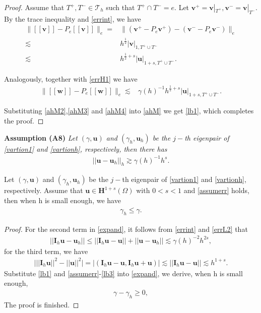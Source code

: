 \documentclass[leqno,CJK]{siamltex704}
\numberwithin{equation}{section}
\def\T{{\mathcal{T}}}
\def\bw{{\mathbf{w}}}
\def\bu{{\mathbf{u}}}
\def\bv{{\mathbf{v}}}
\def\bh{{\mathbf{H}}}
\def\bi{{\mathbf{I}}}
\begin{document}
\begin{proof}
	Assume that $T^+,T^-\in\T_h$ such that $T^+\cap T^-=e$. Let $\bv^+=\bv|_{T^+},\bv^-=\bv|_{T^-}$. By the trace inequality and \eqref{errint}, we have
	\begin{align}\label{ahM3}
		\big\|[\![\bv]\!]-P_e[\![\bv]\!]\big\|_e=&
		\big\|(\bv^+-P_e\bv^+)-(\bv^--P_e\bv^-)\big\|_e\nonumber
		\\
		\lesssim&h^{\frac{1}{2}}|\bv|_{1,T^+\cup T^-}
		\\
		\lesssim& h^{\frac{1}{2}+s}|\bu|_{1+s,T^+\cup T^-}.\nonumber
	\end{align}
	
	Analogously, together with \eqref{errH1} we have
	\begin{align}\label{ahM4}
		\big\|[\![\bw]\!]-P_e[\![\bw]\!]\big\|_e
		\lesssim& \gamma(h)^{-1}h^{\frac{1}{2}+s}|\bu|_{1+s,T^+\cup T^-}.
	\end{align}
	
	Substituting \eqref{ahM2},\eqref{ahM3} and \eqref{ahM4} into \eqref{ahM} we get \eqref{lb1}, which completes the proof.
\end{proof}
	
\textbf{Assumption (A8)}\emph{ Let $(\gamma,\bu)$ and $(\gamma_h,\bu_h)$ be the $j-$th eigenpair of \eqref{vartion1} and \eqref{vartionh}, respectively, then there has
	\begin{eqnarray}\label{assumerr}
		||\bu-\bu_h||_h\gtrsim \gamma(h)^{-1}h^s.
\end{eqnarray}}
\begin{lemma}
	Let $(\gamma,\bu)$ and $(\gamma_h,\bu_h)$ be the $j-$th eigenpair of \eqref{vartion1} and \eqref{vartionh}, respectively. Assume that $\bu\in\bh^{1+s}(\Omega)$ with $0<s<1$ and \eqref{assumerr} holds, then when h is small enough, we have
	\begin{eqnarray*}
		\gamma_h\le\gamma.
	\end{eqnarray*}
\end{lemma}
\begin{proof}
	For the second term in \eqref{expand}, it follows from \eqref{errint} and \eqref{errL2} that
	\begin{eqnarray}\label{lb2}
		||\bi_h\bu-\bu_h||\le ||\bi_h\bu-\bu||+||\bu-\bu_h||\lesssim \gamma(h)^{-2}h^{2s},
	\end{eqnarray}
	for the third term, we have
	\begin{eqnarray}\label{lb3}
		\big|||\bi_h\bu||^2-||\bu||^2\big|=\big|(\bi_h\bu-\bu,\bi_h\bu+\bu)\big|\lesssim ||\bi_h\bu-\bu||\lesssim h^{1+s}.
	\end{eqnarray}
	Substitute \eqref{lb1} and \eqref{assumerr}-\eqref{lb3} into \eqref{expand}, we derive, when h is small enough, 
	\begin{eqnarray*}
		\gamma-\gamma_h\ge0,
	\end{eqnarray*}
	The proof is finished.
\end{proof}
	
\end{document}
